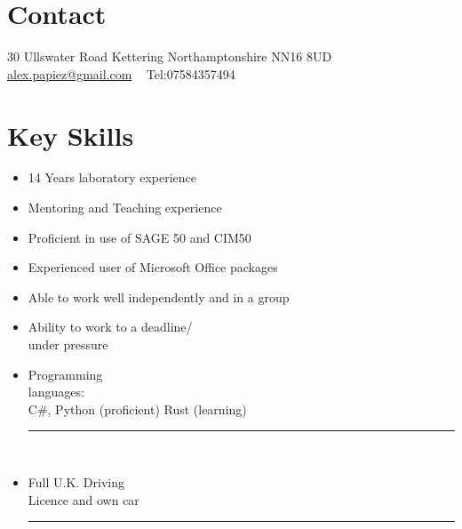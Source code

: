 \documentclass[]{friggeri-cv}
\begin{document}
       {%
       	}
       {}


\begin{aside}
 \vspace{-0.5cm}
  \section{Contact}
    30 Ullswater Road
    Kettering
    Northamptonshire
    NN16 8UD
    ~
    \href{mailto:alex.papiez@gmail.com}{alex.papiez@gmail.com}
    ~
    Tel:07584357494
    ~
  \section{Key Skills}
   \begin{itemize}
   \item 14 Years laboratory experience
   \item Mentoring and Teaching experience
   \item Proficient in use of SAGE 50 and CIM50
   \item Experienced user of Microsoft Office packages
   \item Able to work well independently and in a group
   \item Ability to work to a deadline/ \\ under pressure
   \item Programming \\ languages: \\ C#, Python (proficient) Rust (learning)
   \rule[0.125cm]{0.6\textwidth}{0.4pt}\\
   \item Full U.K. Driving\\ Licence and own car
   \rule[0.125cm]{0.6\textwidth}{0.4pt}
   \end{itemize}

\end{aside}
\vspace{-0.6cm}
\end{document}

